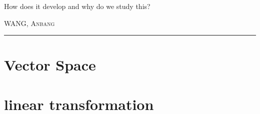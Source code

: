 \documentclass[12pt,a4paper]{book}
\begin{document}
\renewcommand{\contentsname}{\vspace{0cm} Content \vspace{-2cm}}

\begin{titlepage}
\vspace*{2cm}

\noindent
\vspace*{0.5cm}

\vspace{1.5cm}
\epigraph{How does it develop and why do we study this?}%
{ \textsc{WANG, Anbang}}
\null\vfill
\vspace*{1cm}
\noindent
\hfill
\begin{minipage}{0.7\linewidth}
    \begin{flushright}
        \printauthor %
    \end{flushright}
\end{minipage}
%
\begin{minipage}{0.02\linewidth}
    \rule{1pt}{70pt}
\end{minipage}
\titlepagedecoration
\end{titlepage}

\let\cleardoublepage=\clearpage

\tableofcontents



\chapter{Vector Space}

\chapter{linear transformation}

%

%




%
\nocite{*}
\end{document}
